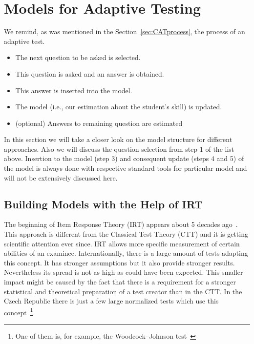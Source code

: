 \chapter{Models for Adaptive Testing}
 

We remind, as was mentioned in the Section~\ref{sec:CATprocess}, the process of an adaptive test.
\begin{itemize}
	\item The next question to be asked is selected.
	\item This question is asked and an answer is obtained.
	\item This answer is inserted into the model.
	\item The model (i.e., our estimation about the student's skill) is updated.
	\item (optional) Answers to remaining question are estimated
\end{itemize}
In this section we will take a closer look on the model structure for different approaches. Also we will discuss the question selection from step 1 of the list above. Insertion to the model (step 3) and consequent update (steps 4 and 5) of the model is always done with respective standard tools for particular model and will not be extensively discussed here.

\section{Building Models with the Help of IRT}
\label{sec_IRT}
The beginning of Item Response Theory (IRT) appears about 5 decades ago~\cite{Lord, Rasch1981, Rasch1993}. This approach is different from the Classical Test Theory (CTT) and it is getting scientific attention ever since.  IRT allows more specific measurement of certain abilities of an examinee. Internationally, there is a large amount of tests adapting this concept. It has stronger assumptions but it also provide stronger results. Nevertheless its spread is not as high as could have been expected. This smaller impact might be caused by the fact that there is a requirement for a stronger statistical and theoretical preparation of a test creator than in the CTT. In the Czech Republic there is just a few large normalized tests which use this concept~\cite{2011psychometrics}\footnote{One of them is, for example, the Woodcock–Johnson test~\cite{Anton2010}}. 

